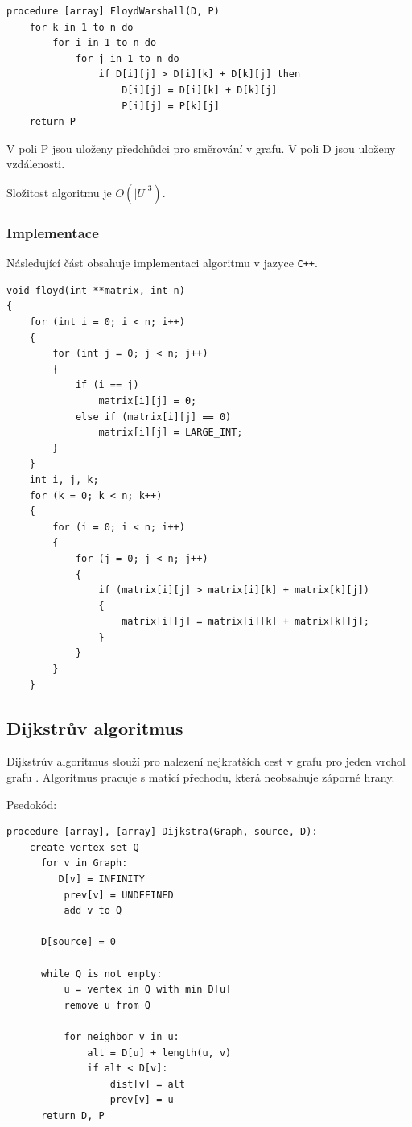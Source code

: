 \documentclass[10pt,a4paper]{article}
\begin{document}
\begin{verbatim}
procedure [array] FloydWarshall(D, P)
    for k in 1 to n do
        for i in 1 to n do
            for j in 1 to n do
                if D[i][j] > D[i][k] + D[k][j] then
                    D[i][j] = D[i][k] + D[k][j]
                    P[i][j] = P[k][j]
    return P
\end{verbatim}

V poli P jsou uloženy předchůdci pro směrování v grafu. V poli D jsou uloženy vzdálenosti.

Složitost algoritmu je $O (|U|^3)$.

\subsubsection{Implementace}

Následující část obsahuje implementaci algoritmu v jazyce \texttt{C++}.

\begin{verbatim}
void floyd(int **matrix, int n)
{
    for (int i = 0; i < n; i++)
    {
        for (int j = 0; j < n; j++)
        {
            if (i == j)
                matrix[i][j] = 0;
            else if (matrix[i][j] == 0)
                matrix[i][j] = LARGE_INT;
        }
    }
    int i, j, k;
    for (k = 0; k < n; k++)
    {
        for (i = 0; i < n; i++)
        {
            for (j = 0; j < n; j++)
            {
                if (matrix[i][j] > matrix[i][k] + matrix[k][j])
                {
                    matrix[i][j] = matrix[i][k] + matrix[k][j];
                }
            }
        }
    }
\end{verbatim}

\subsection{Dijkstrův algoritmus}

Dijkstrův algoritmus slouží pro nalezení nejkratších cest v grafu pro jeden vrchol grafu \cite{dijskraAlg}. Algoritmus pracuje s maticí přechodu, která neobsahuje záporné hrany.

Psedokód:

\begin{verbatim}
procedure [array], [array] Dijkstra(Graph, source, D):
    create vertex set Q
      for v in Graph:
         D[v] = INFINITY
          prev[v] = UNDEFINED
          add v to Q

      D[source] = 0 
      
      while Q is not empty:
          u = vertex in Q with min D[u]
          remove u from Q 
          
          for neighbor v in u:
              alt = D[u] + length(u, v)
              if alt < D[v]:
                  dist[v] = alt 
                  prev[v] = u 
      return D, P
\end{verbatim}
\end{document}
